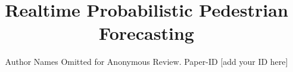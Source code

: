 \documentclass[conference]{IEEEtran}
\begin{document}
\title{Realtime Probabilistic Pedestrian Forecasting}

\author{Author Names Omitted for Anonymous Review. Paper-ID [add your ID here]}





% 


\maketitle
\end{document}
